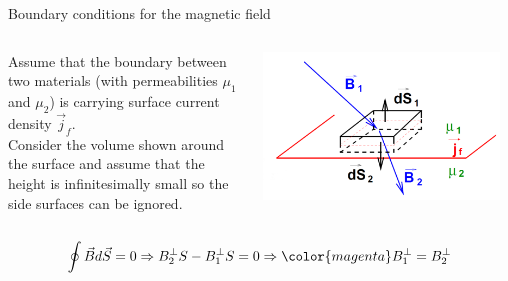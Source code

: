 \begin{frame}{Boundary conditions for the magnetic field}

\begin{columns}
  \begin{column}{0.50\textwidth}
  {\small
     Assume that the boundary between two materials (with
     permeabilities $\mu_1$ and  $\mu_2$)
     is carrying surface current density $\vec{j}_f$.\\
     Consider the volume shown around the surface and
     assume that the height is infinitesimally small so the side
     surfaces can be ignored.
  }
  \end{column}
  \begin{column}{0.50\textwidth}
    \begin{center}
      \includegraphics[width=0.95\textwidth]{./images/schematics/boundary_conditions_magnetic_field_1.png}\\
    \end{center}
  \end{column}
\end{columns}

\begin{equation*}
  \oint \vec{B} d\vec{S} = 0 \Rightarrow
       B_2^{\perp} S - B_1^{\perp} S = 0 \Rightarrow
         {\color{magenta} B_1^{\perp} = B_2^{\perp}}
\end{equation*}

\end{frame}

%
%
%

